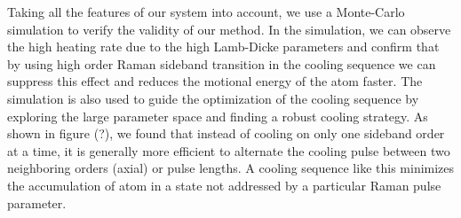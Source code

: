 \documentclass[aps,prl,twocolumn,groupedaddress]{revtex4-1}
\begin{document}
Taking all the features of our system into account, we use a Monte-Carlo simulation to verify
the validity of our method.
In the simulation, we can observe the high heating rate due to the high Lamb-Dicke parameters
and confirm that by using high order Raman sideband transition in the cooling sequence we can
suppress this effect and reduces the motional energy of the atom faster.
The simulation is also used to guide the optimization of the cooling sequence by exploring the
large parameter space and finding a robust cooling strategy. As shown in figure (?),
we found that instead of cooling on only one sideband order at a time, it is generally more
efficient to alternate the cooling pulse between two neighboring orders (axial) or pulse lengths.
A cooling sequence like this minimizes the accumulation of atom in a state not addressed by a
particular Raman pulse parameter.
\end{document}
